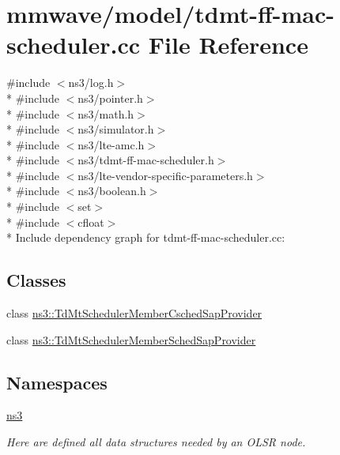 \hypertarget{mmwave_2model_2tdmt-ff-mac-scheduler_8cc}{}\section{mmwave/model/tdmt-\/ff-\/mac-\/scheduler.cc File Reference}
\label{mmwave_2model_2tdmt-ff-mac-scheduler_8cc}
{\ttfamily \#include $<$ns3/log.\+h$>$}\\*
{\ttfamily \#include $<$ns3/pointer.\+h$>$}\\*
{\ttfamily \#include $<$ns3/math.\+h$>$}\\*
{\ttfamily \#include $<$ns3/simulator.\+h$>$}\\*
{\ttfamily \#include $<$ns3/lte-\/amc.\+h$>$}\\*
{\ttfamily \#include $<$ns3/tdmt-\/ff-\/mac-\/scheduler.\+h$>$}\\*
{\ttfamily \#include $<$ns3/lte-\/vendor-\/specific-\/parameters.\+h$>$}\\*
{\ttfamily \#include $<$ns3/boolean.\+h$>$}\\*
{\ttfamily \#include $<$set$>$}\\*
{\ttfamily \#include $<$cfloat$>$}\\*
Include dependency graph for tdmt-\/ff-\/mac-\/scheduler.cc\+:
\subsection*{Classes}
\begin{DoxyCompactItemize}
\item 
class \hyperlink{classns3_1_1TdMtSchedulerMemberCschedSapProvider}{ns3\+::\+Td\+Mt\+Scheduler\+Member\+Csched\+Sap\+Provider}
\item 
class \hyperlink{classns3_1_1TdMtSchedulerMemberSchedSapProvider}{ns3\+::\+Td\+Mt\+Scheduler\+Member\+Sched\+Sap\+Provider}
\end{DoxyCompactItemize}
\subsection*{Namespaces}
\begin{DoxyCompactItemize}
\item 
 \hyperlink{namespacens3}{ns3}
\begin{DoxyCompactList}\small\item\em Here are defined all data structures needed by an O\+L\+SR node. \end{DoxyCompactList}\end{DoxyCompactItemize}
